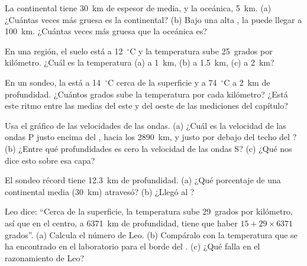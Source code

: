 \begin{exercise}[$\star\star$]\label{exo:g6:inside-the-earth:6}
La  continental tiene 30~km de espesor de media, y la 
oceánica, 5~km. (a) ¿Cuántas veces más gruesa es la  continental?
(b) Bajo una alta , la  puede llegar a 100~km. ¿Cuántas
veces más gruesa que la  oceánica es?
\end{exercise}

\begin{exercise}[$\star\star$]\label{exo:g6:inside-the-earth:7}
En una región, el suelo está a 12~$^\circ$C y la temperatura sube
25~grados por kilómetro. ¿Cuál es la temperatura (a) a 1~km, (b) a
1.5~km, (c) a 2~km?
\end{exercise}

\begin{exercise}[$\star\star$]\label{exo:g6:inside-the-earth:8}
En un sondeo, la  está a 14~$^\circ$C cerca de la superficie y a
74~$^\circ$C a 2~km de profundidad. ¿Cuántos grados sube la temperatura por
cada kilómetro? ¿Está este ritmo entre las medias del este y del oeste de
las mediciones del capítulo?
\end{exercise}

\begin{exercise}[$\star\star$]\label{exo:g6:inside-the-earth:9}
Usa el gráfico de las velocidades de las ondas. (a) ¿Cuál es la velocidad
de las ondas P justo encima del , hacia los 2890~km, y justo por
debajo del techo del ? (b) ¿Entre qué profundidades es cero la
velocidad de las ondas S? (c) ¿Qué nos dice esto sobre esa capa?
\end{exercise}

\begin{exercise}[$\star\star$]\label{exo:g6:inside-the-earth:10}
El sondeo récord tiene 12.3~km de profundidad. (a) ¿Qué porcentaje de una
 continental media (30~km) atravesó? (b) ¿Llegó al ?
\end{exercise}

\begin{exercise}[$\star\star\star$]\label{exo:g6:inside-the-earth:11}
Leo dice: ``Cerca de la superficie, la temperatura sube 29~grados por
kilómetro, así que en el centro, a 6371~km de profundidad, tiene que haber
$15 + 29 \times 6371$ grados''. (a) Calcula el número de Leo. (b) Compáralo
con la temperatura que se ha encontrado en el laboratorio para el borde del
. (c) ¿Qué falla en el razonamiento de Leo?
\end{exercise}

